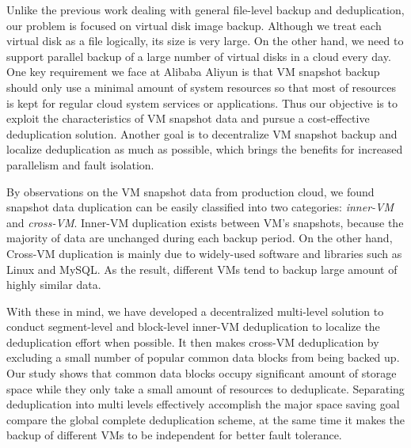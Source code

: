 Unlike the previous work dealing with general file-level backup and deduplication, our problem is focused on 
virtual disk image backup. Although we treat each virtual disk  as a file logically, its size is very large.
On the other hand, we need to support parallel backup of a large number of virtual disks in a cloud every day. 
One key requirement we face at Alibaba Aliyun is that VM snapshot backup should only use a minimal amount of system
resources so that most of resources is kept for regular cloud system services or applications.
Thus our objective is to exploit the characteristics of VM snapshot data and
pursue a cost-effective deduplication solution. 
Another goal  is to decentralize VM snapshot backup and  localize  deduplication as much as possible,
which brings the benefits for increased parallelism  and fault isolation.

By observations on the VM snapshot data from production cloud, we found snapshot data duplication 
can be easily classified into two categories: \emph{inner-VM} and \emph{cross-VM}. Inner-VM duplication
exists between VM's snapshots, because the majority of data are unchanged during each backup period. 
On the other hand, Cross-VM duplication is mainly due to widely-used software and libraries such as Linux and MySQL.
As the result, different VMs tend to backup large amount of highly similar data.

With these in mind, we  have developed a decentralized multi-level solution to conduct 
segment-level  and block-level inner-VM  deduplication to localize the deduplication effort when possible.
It then makes cross-VM deduplication by excluding a small number of
popular common data blocks from being backed up. Our study shows that common data blocks
occupy significant amount of storage space while they only take
a small amount of resources to deduplicate.
Separating deduplication into multi levels effectively accomplish the major space saving goal
compare the global complete deduplication scheme, at the same time it makes
the backup of different VMs to be independent for better fault tolerance.


